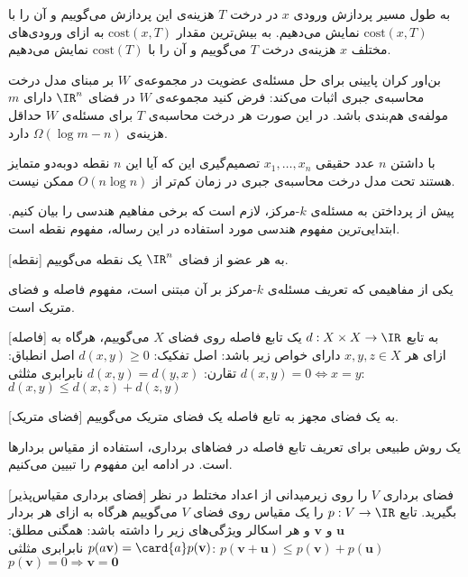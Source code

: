 به طول مسیر پردازش ورودی $x$ در درخت $T$ هزینه‌ی این پردازش می‌گوییم و آن را با
$\mathrm{\mathrm{cost}}(x,T)$
نمایش می‌دهیم. به بیش‌ترین مقدار
$\mathrm{\mathrm{cost}}(x,T)$
به ازای ورودی‌های مختلف $x$ هزینه‌ی درخت $T$ می‌گوییم و آن را با
$\mathrm{\mathrm{cost}}(T)$
نمایش می‌دهیم.

بن‌اور  کران پایینی برای حل مسئله‌ی عضویت در مجموعه‌ی $W$ بر مبنای مدل درخت محاسبه‌ی جبری اثبات می‌کند:
فرض کنید مجموعه‌ی $W$ در فضای $\IR^n$ دارای $m$ مولفه‌ی هم‌بندی باشد. در این صورت هر درخت محاسبه‌ی $T$ برای مسئله‌ی $W$ حداقل هزینه‌ی
$\Omega(\log m - n)$
دارد.

با داشتن $n$ عدد حقیقی $x_1, \ldots, x_n$ تصمیم‌گیری این که آیا این $n$ نقطه دوبه‌دو متمایز هستند تحت مدل درخت محاسبه‌ی جبری در زمان کم‌تر از $O(n \log n)$ ممکن نیست.

پیش از پرداختن به مسئله‌ی $k$-مرکز، لازم است که برخی مفاهیم هندسی را بیان کنیم.
ابتدایی‌ترین مفهوم هندسی مورد استفاده در این رساله، مفهوم نقطه است.

[نقطه]
به هر عضو از فضای $\IR^n$ یک نقطه می‌گوییم.

یکی از مفاهیمی که تعریف مسئله‌ی $k$-مرکز بر آن مبتنی است، مفهوم فاصله و فضای متریک است.

[فاصله]
به تابع
$d : X \times X \rightarrow \IR$
یک تابع فاصله روی فضای $X$ می‌گوییم، هرگاه به ازای هر $x,y,z \in X$ دارای خواص زیر باشد:
 اصل تفکیک:
$d(x,y) \geq 0$
 اصل انطباق:
$d(x,y) = 0 \Leftrightarrow x=y$
 تقارن:
$d(x,y) = d(y,x)$
 نابرابری مثلثی:
$d(x,y) \leq d(x,z) + d(z,y)$

[فضای متریک]
به یک فضای مجهز به تابع فاصله یک فضای متریک می‌گوییم.

یک روش طبیعی برای تعریف تابع فاصله در فضاهای برداری، استفاده از مقیاس بردارها است. در ادامه این مفهوم را تبیین می‌کنیم.

[فضای برداری مقیاس‌پذیر]
فضای برداری $V$ را روی زیرمیدانی از اعداد مختلط در نظر بگیرید. تابع
$p : V \rightarrow \IR$
را یک مقیاس روی فضای $V$ می‌گوییم هرگاه به ازای هر بردار $\mathbf{u}$ و $\mathbf{v}$ و هر اسکالر ویژگی‌های زیر را داشته باشد:
 همگنی مطلق:
$p(a\mathbf{v}) = \card{a} p(\mathbf{v})$
 نابرابری مثلثی:
$p(\mathbf{v} + \mathbf{u}) \leq p(\mathbf{v}) + p(\mathbf{u})$
$p(\mathbf{v}) = 0 \Rightarrow \mathbf{v} = \mathbf{0}$

